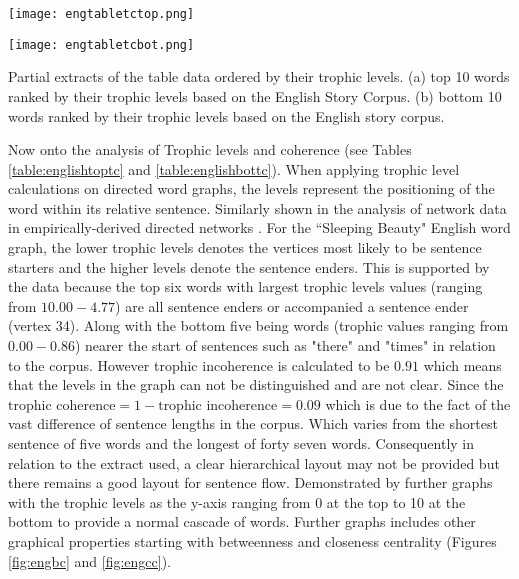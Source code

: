 \begin{table}[H]
\centering
\begin{subtable}{.45\textwidth}
	\centering
	\texttt{[image: engtabletctop.png]}
	\caption{}
	\label{table:englishtoptc}
\end{subtable}
\hfill
\begin{subtable}{.45\textwidth}
	\centering
	\texttt{[image: engtabletcbot.png]}
	\caption{}
	\label{table:englishbottc}
\end{subtable}
\caption{Partial extracts of the table data ordered by their trophic levels. (a) top 10 words ranked by their trophic levels based on the English Story Corpus. (b) bottom 10 words ranked by their trophic levels based on the English story corpus.}
\end{table}

Now onto the analysis of Trophic levels and coherence (see Tables \ref{table:englishtoptc} and \ref{table:englishbottc}). When applying trophic level calculations on directed word graphs, the levels represent the positioning of the word within its relative sentence. Similarly shown in the analysis of network data in empirically-derived directed networks \cite{johnson2017looplessness}. For the ``Sleeping Beauty" English word graph, the lower trophic levels denotes the vertices most likely to be sentence starters and the higher levels denote the sentence enders. This is supported by the data because the top six words with largest trophic levels values (ranging from $10.00-4.77$) are all sentence enders or accompanied a sentence ender (vertex 34). Along with the bottom five being words (trophic values ranging from $0.00-0.86$) nearer the start of sentences such as "there" and "times" in relation to the corpus. However trophic incoherence is calculated to be $0.91$ which means that the levels in the graph can not be distinguished and are not clear. Since the $\text{trophic coherence} = 1 - \text{trophic incoherence} = 0.09$ which is due to the fact of the vast difference of sentence lengths in the corpus. Which varies from the shortest sentence of five words and the longest of forty seven words. Consequently in relation to the extract used, a clear hierarchical layout may not be provided but there remains a good layout for sentence flow. Demonstrated by further graphs with the trophic levels as the y-axis ranging from 0 at the top to 10 at the bottom to provide a normal cascade of words. Further graphs includes other graphical properties starting with betweenness and closeness centrality (Figures \ref{fig:engbc} and \ref{fig:engcc}).

